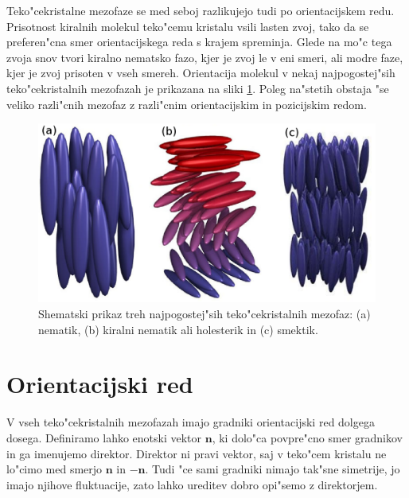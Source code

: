\documentclass[12pt,twoside,openright,final]{report}
\begin{document}
Teko"cekristalne mezofaze se med seboj razlikujejo tudi po orientacijskem redu. 
Prisotnost kiralnih molekul teko"cemu kristalu vsili lasten zvoj, tako da se preferen"cna smer orientacijskega reda s krajem spreminja. 
Glede na mo"c tega zvoja snov tvori kiralno nematsko fazo, kjer je zvoj le v eni smeri, ali modre faze, kjer je zvoj prisoten v vseh smereh. 
Orientacija molekul v nekaj najpogostej"sih teko"cekristalnih mezofazah je prikazana na sliki \ref{fig:faze}. 
Poleg na"stetih obstaja "se veliko razli"cnih mezofaz z razli"cnim orientacijskim in pozicijskim redom. 

\begin{figure}[h]
\centering
  \includegraphics[width=.8\textwidth]{faze}
 \caption{Shematski prikaz treh najpogostej"sih teko"cekristalnih mezofaz: (a) nematik, (b) kiralni nematik ali holesterik in (c) smektik\cite{barrett:lc}.}
  \label{fig:faze}
\end{figure}

\section{Orientacijski red}

V vseh teko"cekristalnih mezofazah imajo gradniki orientacijski red dolgega dosega. Definiramo lahko enotski vektor $\mathbf{n}$, ki dolo"ca povpre"cno smer gradnikov in ga imenujemo direktor. Direktor ni pravi vektor, saj v teko"cem kristalu ne lo"cimo med smerjo $\mathbf{n}$ in $\mathbf{-n}$. Tudi "ce sami gradniki nimajo tak"sne simetrije, jo imajo njihove fluktuacije, zato lahko ureditev dobro opi"semo z direktorjem\cite{mermin}. 
\end{document}

